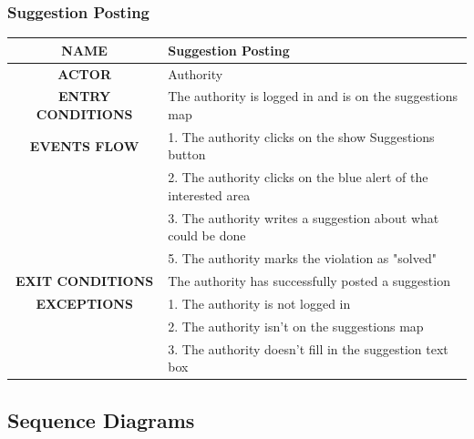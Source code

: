 \documentclass[12pt,a4paper]{article}
\begin{document}
\subsubsection{Suggestion Posting}
\begin{center}
			\begin{tabular}{| c | l |}
				\hline
				\textbf{NAME} & Suggestion Posting\\
				\hline
				\textbf{ACTOR} & Authority \\
				\hline
				\textbf{ENTRY CONDITIONS} & The authority is logged in and is on the suggestions map\\
				\hline
				\textbf{EVENTS FLOW}  &
				1. The authority clicks on the show Suggestions button\\
				&2. The authority clicks on the blue alert of the interested area\\ 
				&3. The authority writes a suggestion about what could be done \\
				&5. The authority marks the violation as "solved"\\
				\hline
				\textbf{EXIT CONDITIONS} & The authority has successfully posted a suggestion \\ 
				\hline
				\textbf{EXCEPTIONS} &
				1. The authority is not logged in\\
				&2. The authority isn't on the suggestions map\\
				&3. The authority doesn't fill in the suggestion text box\\
				\hline
			\end{tabular}
		\end{center}
\subsection{Sequence Diagrams}
\end{document}
